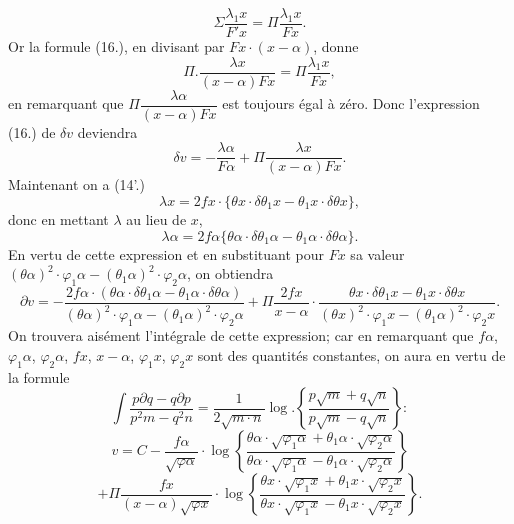 \documentclass{article}
\begin{document}
\[ \Sigma\frac{\lambda_1 x}{F'x} = \Pi\frac{\lambda_1 x}{Fx}. \tag{20} \]
Or la formule (16.), en divisant par $Fx \cdot (x-\alpha)$, donne
\[ \Pi.\frac{\lambda x}{(x-\alpha)Fx} = \Pi\frac{\lambda_1 x}{Fx}, \tag{21} \]
en remarquant que $\Pi\dfrac{\lambda\alpha}{(x-\alpha)Fx}$ est toujours égal à zéro. Donc l'expression (16.) de $\delta v$ deviendra
\[ \delta v = -\frac{\lambda\alpha}{F\alpha} + \Pi\frac{\lambda x}{(x-\alpha)Fx}. \tag{22} \]
Maintenant on a (14'.)
\[ \lambda x = 2fx \cdot \{\theta x \cdot \delta\theta_1 x - \theta_1 x \cdot \delta\theta x\}, \]
donc en mettant $\lambda$ au lieu de $x$,
\[ \lambda\alpha = 2f\alpha\{\theta\alpha \cdot \delta\theta_1\alpha - \theta_1\alpha \cdot \delta\theta\alpha\}. \]
En vertu de cette expression et en substituant pour $Fx$ sa valeur $(\theta\alpha)^{2} \cdot \varphi_1\alpha - (\theta_1\alpha)^{2} \cdot \varphi_2\alpha$, on obtiendra
\[ \partial v = -\frac{2f\alpha \cdot (\theta\alpha \cdot \delta\theta_1\alpha - \theta_1\alpha \cdot \delta\theta\alpha)}{(\theta\alpha)^{2} \cdot \varphi_1\alpha - (\theta_1\alpha)^{2} \cdot \varphi_2\alpha} + \Pi\frac{2fx}{x-\alpha} \cdot \frac{\theta x \cdot \delta\theta_1 x - \theta_1 x \cdot \delta\theta x}{(\theta x)^{2} \cdot \varphi_1 x - (\theta_1\alpha)^{2} \cdot \varphi_2 x}. \]
On trouvera aisément l'intégrale de cette expression; car en remarquant que $f\alpha$, $\varphi_1\alpha$, $\varphi_2\alpha$, $fx$, $x-\alpha$, $\varphi_1 x$, $\varphi_2 x$ sont des quantités constantes, on aura en vertu de la formule
\[ \int \frac{p\partial q - q\partial p}{p^{2}m - q^{2}n} = \frac{1}{2\sqrt{m \cdot n}}\log.\left\{\frac{p\sqrt{m}+q\sqrt{n}}{p\sqrt{m}-q\sqrt{n}}\right\}: \]
\[ v = C - \frac{f\alpha}{\sqrt{\varphi\alpha}} \cdot \log\left\{\frac{\theta\alpha \cdot \sqrt{\varphi_1\alpha}+\theta_1\alpha \cdot \sqrt{\varphi_2\alpha}}{\theta\alpha \cdot \sqrt{\varphi_1\alpha}-\theta_1\alpha \cdot \sqrt{\varphi_2\alpha}}\right\} \tag{23} \]
\[ + \Pi\frac{fx}{(x-\alpha)\sqrt{\varphi x}} \cdot \log\left\{\frac{\theta x \cdot \sqrt{\varphi_1 x}+\theta_1 x \cdot \sqrt{\varphi_2 x}}{\theta x \cdot \sqrt{\varphi_1 x}-\theta_1 x \cdot \sqrt{\varphi_2 x}}\right\}. \]
\end{document}
